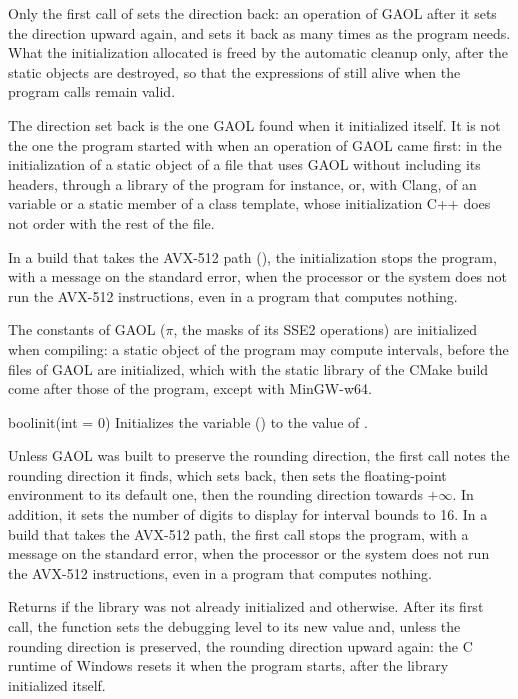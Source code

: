 \documentclass[12pt,a4paper,twoside,openright]{book}
\begin{document}
\medskip
Only the first call of  sets the direction back: an operation
of GAOL after it sets the direction upward again, and
 sets it back as many times as the program
needs.\newinvfive{} What the initialization allocated is freed by the
automatic cleanup only, after the static objects are destroyed, so that the
expressions of  still alive when the
program calls  remain valid.

\medskip
The direction set back is the one GAOL found when it initialized itself. It
is not the one the program started with when an operation of GAOL came
first: in the initialization of a static object of a file that uses GAOL
without including its headers, through a library of the program for
instance, or, with Clang, of an  variable or a static member of
a class template, whose initialization C++ does not order with the rest of
the file.

\medskip
In a build that takes the AVX-512 path (), the
initialization stops the program, with a message on the standard error, when
the processor or the system does not run the AVX-512 instructions, even in a
program that computes nothing.\newinvfive

\medskip
The constants of GAOL ($\pi$, the masks of its SSE2 operations) are
initialized when compiling: a static object of the program may compute
intervals, before the files of GAOL are initialized, which with the static
library of the CMake build come after those of the program, except with
MinGW-w64.\newinvfive

\begin{deffun}{bool}{init}{(int  = 0)}
Initializes the variable  ()
to the value of .

Unless GAOL was built to preserve the rounding direction, the first call notes
the rounding direction it finds, which  sets back, then sets
the floating-point environment to its default one, then the rounding
direction towards $+\infty$. In addition, it sets the number of digits to
display for interval bounds to 16. In a build that takes the AVX-512 path,
the first call stops the program, with a message on the standard error, when
the processor or the system does not run the AVX-512 instructions, even in a
program that computes nothing.\newinvfive

Returns  if the library was not already initialized and
 otherwise. After its first call, the function sets the debugging
level to its new value and, unless the rounding direction is preserved, the
rounding direction upward again: the C runtime of Windows resets it when the
program starts, after the library initialized itself.
\end{deffun}
\end{document}
